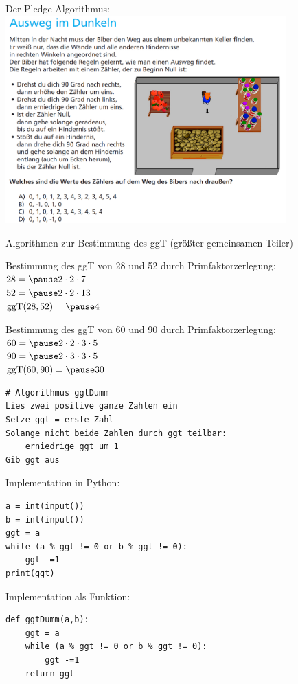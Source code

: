 \documentclass[10pt]{beamer}
\begin{document}
\begin{frame}[fragile]
Der Pledge-Algorithmus:
\includegraphics[height=8cm]{bild1.png}
\end{frame}

\begin{frame}[fragile]
Algorithmen zur Bestimmung des ggT (größter gemeinsamen Teiler)

Bestimmung des ggT von 28 und 52 durch Primfaktorzerlegung: \\
$28 =\pause 2 \cdot 2 \cdot 7$ \\
$52 =\pause 2 \cdot 2 \cdot 13$  \\
$\text{ggT}(28,52) = \pause4$

Bestimmung des ggT von 60 und 90 durch Primfaktorzerlegung: \\
$60 =\pause 2 \cdot 2 \cdot 3 \cdot 5$ \\
$90 =\pause 2 \cdot 3 \cdot 3 \cdot 5$ \\
$\text{ggT}(60,90) = \pause30$
\end{frame}

\begin{frame}[fragile]

\begin{lstlisting} 
# Algorithmus ggtDumm
Lies zwei positive ganze Zahlen ein
Setze ggt = erste Zahl
Solange nicht beide Zahlen durch ggt teilbar:
	erniedrige ggt um 1
Gib ggt aus
\end{lstlisting}    
Implementation in Python:  \pause

\begin{lstlisting} 
a = int(input())
b = int(input())
ggt = a
while (a % ggt != 0 or b % ggt != 0):
    ggt -=1
print(ggt)
\end{lstlisting} 

Implementation als Funktion:  \pause
\begin{lstlisting} 
def ggtDumm(a,b):
    ggt = a
    while (a % ggt != 0 or b % ggt != 0):
        ggt -=1
    return ggt
\end{lstlisting} 
\end{frame}
\end{document}
